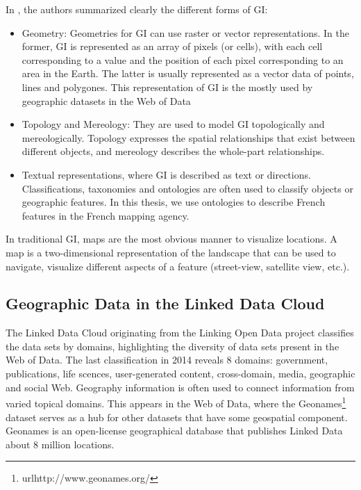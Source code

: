 In \cite{ldgeob2013}, the authors summarized clearly the different forms of GI:
\begin{itemize}
\item Geometry: Geometries for GI can use raster or vector representations. In the former, GI is represented as an array of pixels  (or cells), with each cell corresponding to a value and the position of each pixel corresponding to an area in the Earth. The latter is usually represented as a vector data of points, lines and polygones. This representation of GI is the mostly used by geographic datasets in the Web of Data
\item  Topology and Mereology: They are used to model GI topologically and mereologically. Topology expresses the spatial relationships that exist between different objects, and mereology describes the whole-part relationships.
\item  Textual representations, where GI is described as text or directions. Classifications, taxonomies and ontologies are often used to classify objects or geographic features. In this thesis, we use ontologies to describe French features in the French mapping agency.
\end{itemize}
	 
In traditional GI, maps are the most obvious manner to visualize locations. A map is a two-dimensional representation of the landscape that can be used to navigate, visualize different aspects of a feature (street-view, satellite view, etc.).  

\subsection{Geographic Data in the Linked Data Cloud}
\label{sec:geoldcloud}

The Linked Data Cloud originating from the Linking Open Data project classifies the data sets by domains, highlighting the diversity of data sets present in the Web of Data. The last classification in 2014 reveals 8 domains: government, publications, life scences, user-generated content, cross-domain, media, geographic and social Web. 
Geography information is often used to connect information from varied topical domains. This appears in the Web of Data, where the Geonames\footnote{url{http://www.geonames.org/}} dataset serves as a hub for other datasets that have some geospatial component. Geonames is an open-license geographical database that publishes Linked Data about 8 million locations.

